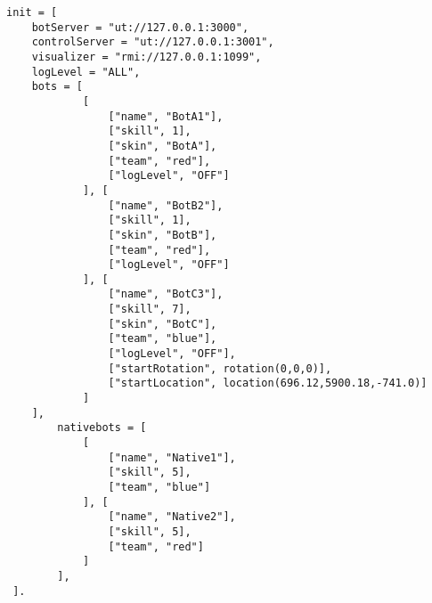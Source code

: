\documentclass[11pt,a4paper]{article}
\begin{document}
\begin{verbatim}
init = [
    botServer = "ut://127.0.0.1:3000",
    controlServer = "ut://127.0.0.1:3001",
    visualizer = "rmi://127.0.0.1:1099",
    logLevel = "ALL", 
    bots = [
            [
                ["name", "BotA1"],
                ["skill", 1],
                ["skin", "BotA"], 
                ["team", "red"],
                ["logLevel", "OFF"]
            ], [
                ["name", "BotB2"],
                ["skill", 1],
                ["skin", "BotB"], 
                ["team", "red"],
                ["logLevel", "OFF"]
            ], [
                ["name", "BotC3"],
                ["skill", 7],
                ["skin", "BotC"], 
                ["team", "blue"],
                ["logLevel", "OFF"],
                ["startRotation", rotation(0,0,0)],
                ["startLocation", location(696.12,5900.18,-741.0)]
            ]
    ],
        nativebots = [
            [
                ["name", "Native1"],
                ["skill", 5],
                ["team", "blue"]	
            ], [
                ["name", "Native2"],
                ["skill", 5],
                ["team", "red"]	
            ]    
        ],
 ].
\end{verbatim}
\end{document}

